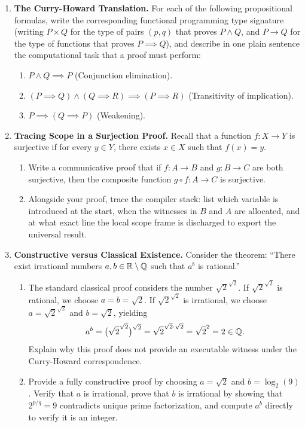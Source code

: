 \begin{enumerate}
  \item \textbf{The Curry-Howard Translation.}
  For each of the following propositional formulas, write the corresponding functional programming type signature (writing $P \times Q$ for the type of pairs $(p, q)$ that proves $P \land Q$, and $P \to Q$ for the type of functions that proves $P \implies Q$), and describe in one plain sentence the computational task that a proof must perform:
  \begin{enumerate}[label=(\alph*)]
    \item $P \land Q \implies P$ (Conjunction elimination).
    \item $(P \implies Q) \land (Q \implies R) \implies (P \implies R)$ (Transitivity of implication).
    \item $P \implies (Q \implies P)$ (Weakening).
  \end{enumerate}

  \item \textbf{Tracing Scope in a Surjection Proof.}
  Recall that a function $f\colon X \to Y$ is surjective if for every $y \in Y$, there exists $x \in X$ such that $f(x) = y$.
  \begin{enumerate}[label=(\alph*)]
    \item Write a communicative proof that if $f\colon A \to B$ and $g\colon B \to C$ are both surjective, then the composite function $g \circ f\colon A \to C$ is surjective.
    \item Alongside your proof, trace the compiler stack: list which variable is introduced at the start, when the witnesses in $B$ and $A$ are allocated, and at what exact line the local scope frame is discharged to export the universal result.
  \end{enumerate}

  \item \textbf{Constructive versus Classical Existence.}
  Consider the theorem: ``There exist irrational numbers $a, b \in \mathbb{R} \setminus \mathbb{Q}$ such that $a^b$ is rational.''
  \begin{enumerate}[label=(\alph*)]
    \item The standard classical proof considers the number $\sqrt{2}^{\sqrt{2}}$. If $\sqrt{2}^{\sqrt{2}}$ is rational, we choose $a = b = \sqrt{2}$. If $\sqrt{2}^{\sqrt{2}}$ is irrational, we choose $a = \sqrt{2}^{\sqrt{2}}$ and $b = \sqrt{2}$, yielding
    \[
    a^b = \bigl(\sqrt{2}^{\sqrt{2}}\bigr)^{\sqrt{2}} = \sqrt{2}^{\sqrt{2} \cdot \sqrt{2}} = \sqrt{2}^{2} = 2 \in \mathbb{Q}.
    \]
    Explain why this proof does not provide an executable witness under the Curry-Howard correspondence.
    \item Provide a fully constructive proof by choosing $a = \sqrt{2}$ and $b = \log_2(9)$. Verify that $a$ is irrational, prove that $b$ is irrational by showing that $2^{p/q} = 9$ contradicts unique prime factorization, and compute $a^b$ directly to verify it is an integer.
  \end{enumerate}
\end{enumerate}

\newpage

